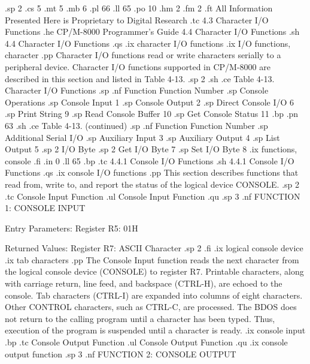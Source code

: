 .sp 2
.cs 5
.mt 5
.mb 6
.pl 66
.ll 65
.po 10
.hm 2
.fm 2
.ft All Information Presented Here is Proprietary to Digital Research
.tc    4.3 Character I/O Functions
.he CP/M-8000 Programmer's Guide          4.4  Character I/O Functions
.sh
4.4  Character I/O Functions
.qs
.ix character I/O functions
.ix I/O functions, character
.pp 
Character I/O functions read or write characters serially to a 
peripheral device. Character I/O functions supported in CP/M-8000
are described in this section and listed in Table 4-13. 
.sp 2
.sh 
.ce
Table 4-13. Character I/O Functions
.sp 
.nf
                  Function             Function Number
.sp 
            Console Operations
.sp
               Console Input                  1
.sp
               Console Output                 2
.sp
               Direct Console I/O             6
.sp
               Print String                   9
.sp
               Read Console Buffer            10
.sp
               Get Console Status             11
.bp
.pn 63
.sh
.ce
Table 4-13.  (continued)
.sp 
.nf
                  Function             Function Number
.sp 
            Additional Serial I/O
.sp
               Auxiliary Input                3
.sp
               Auxiliary Output               4
.sp 
               List Output                    5
.sp 2
            I/O Byte 
.sp 2
               Get I/O Byte                   7
.sp
               Set I/O Byte                   8
.ix functions, console
.fi
.in 0
.ll 65
.bp
.tc         4.4.1  Console I/O Functions
.sh
4.4.1  Console I/O Functions
.qs
.ix console I/O functions
.pp
This section describes functions that read from, write to, and
report the status of the logical device CONSOLE.
.sp 2
.tc                Console Input Function
.ul
Console Input Function
.qu
.sp 3
.nf
                   FUNCTION 1:  CONSOLE INPUT

               Entry Parameters:
                  Register   R5:  01H

               Returned  Values:
                  Register   R7:  ASCII Character
.sp 2
.fi
.ix logical console device
.ix tab characters
.pp
The Console Input function reads the next character from the
logical console device (CONSOLE) to register   R7.  Printable
characters, along with carriage return, line feed, and backspace
(CTRL-H), are echoed to the console. Tab characters (CTRL-I)
are expanded into columns of eight characters. Other CONTROL
characters, such as CTRL-C, are processed.  The BDOS does not
return to the calling program until a character has been typed.
Thus, execution of the program is suspended until a character is ready. 
.ix console input
.bp
.tc                Console Output Function
.ul
Console Output Function
.qu
.ix console output function
.sp 3
.nf
                   FUNCTION 2:  CONSOLE OUTPUT

